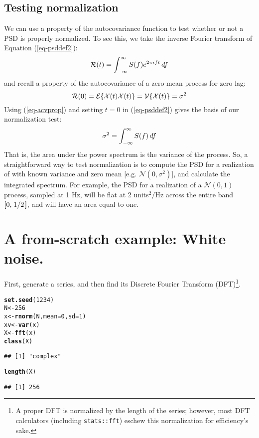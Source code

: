 \documentclass[12pt]{article}\usepackage{graphicx, color}
\makeatletter
\newcommand{\hlfunctioncall}[1]{\textcolor[rgb]{0.501960784313725,0,0.329411764705882}{\textbf{#1}}}%
\newenvironment{kframe}{%
 \def\at@end@of@kframe{}%
 \ifinner\ifhmode%
  \def\at@end@of@kframe{\end{minipage}}%
  \begin{minipage}{\columnwidth}%
 \fi\fi%
 \def\FrameCommand##1{\hskip\@totalleftmargin \hskip-\fboxsep
 \colorbox{shadecolor}{##1}\hskip-\fboxsep
     \hskip-\linewidth \hskip-\@totalleftmargin \hskip\columnwidth}%
 \MakeFramed {\advance\hsize-\width
   \@totalleftmargin\z@ \linewidth\hsize
   \@setminipage}}%
 {\par\unskip\endMakeFramed%
 \at@end@of@kframe}
\newenvironment{knitrout}{}{} %
\newcommand{\Rcmd}[1]{\texttt{#1}}
\newcommand{\idx}[1]{\index{#1}{#1}}
\makeatother
\begin{document}
%

\subsection{Testing normalization}
We can use a property of the autocovariance function \dACV{\tau}
to test whether or not a PSD is properly normalized.  To see this, we
take the
inverse Fourier transform of Equation (\ref{eq-psddef2}):
%
\begin{equation}
\label{eq-psdinv}
\mathcal{R}(t) = \int_{- \infty} ^{\infty} S(f){} e ^ {2 \pi i ft} \, df
\end{equation}
%
and recall a property of the autocovariance of a zero-mean 
process for zero lag:
%
\begin{equation}
\label{eq-acvprop}
\mathcal{R}(0) = \mathcal{E} \{ \mathcal{X}(t){} \mathcal{X}(t){} \} = \mathcal{V} \{ \mathcal{X}(t){} \} = \sigma ^ 2
\end{equation}
%
Using (\ref{eq-acvprop}) and setting $t = 0$ in
(\ref{eq-psddef2}) gives the basis of our normalization test:
%
\begin{equation}
\label{eq-psdnorm}
\sigma ^ 2 = \int_{- \infty} ^{\infty} S (f) \, df
\end{equation}
%
That is,
the area under the power spectrum is the variance
of the process.
So, a straightforward way to test normalization 
is to compute the PSD for a realization of \dXstoch{} with
known variance and zero mean [e.g. $\mathcal{N}(0,\sigma^2)$], and 
calculate the integrated spectrum.
For example, the \idx{single-sided}
PSD for a realization of a $\mathcal{N}(0, 1)$ process, 
sampled at 1 Hz, 
will be flat at 2 units$^2/$Hz 
across the entire band $[0, \left.1\middle/2\right.]$,
and will have
an area equal to one.

\section{A from-scratch example: White noise.}
First, generate a series, and then find its Discrete Fourier Transform 
(DFT)\footnote{
A proper DFT is normalized by the length of the series; however, most
DFT calculators (including \Rcmd{stats::fft}) eschew this normalization for 
efficiency's sake.
}.
\begin{knitrout}
\color{fgcolor}\begin{kframe}
\begin{alltt}
\hlfunctioncall{set.seed}(1234)
N <- 256
x <- \hlfunctioncall{rnorm}(N, mean = 0, sd = 1)
xv <- \hlfunctioncall{var}(x)
X <- \hlfunctioncall{fft}(x)
\hlfunctioncall{class}(X)
\end{alltt}
\begin{verbatim}
## [1] "complex"
\end{verbatim}
\begin{alltt}
\hlfunctioncall{length}(X)
\end{alltt}
\begin{verbatim}
## [1] 256
\end{verbatim}
\end{kframe}
\end{knitrout}
\end{document}
